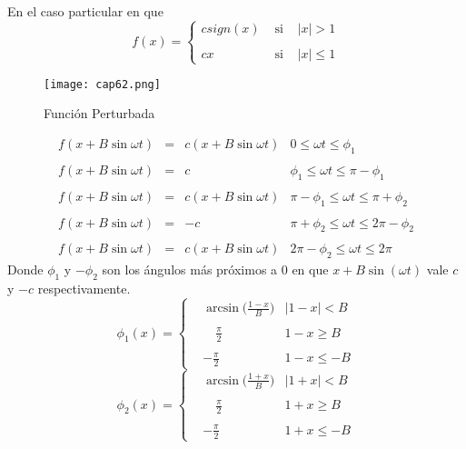 \documentclass[letter]{article}
\begin{document}
\\
En el caso particular en que
\begin{equation}\label{FAP1}
f(x)=\left\{\begin{array}{lcl} c sign(x)&\textrm{ si } & |x|>1\\&&
\\
cx &\textrm{ si }&|x|\leq 1
\end{array}\right.
\end{equation}
\begin{figure}[h]
\centering
\texttt{[image: cap62.png]}
\caption{Funci{\'o}n Perturbada} \label{afig62}
\end{figure}
\begin{equation}\label{eao3}
\begin{array}{lcll}
f(x+B\sin\omega t)&=&c(x+B\sin\omega  t)&0\leq\omega
t\leq\phi_1\\&&&\\ f(x+B\sin\omega t)&=&c&\phi_1\leq\omega  t\leq
\pi-\phi_1\\&&&\\ f(x+B\sin\omega t)&=&c(x+B\sin\omega
t)&\pi-\phi_1\leq\omega  t\leq \pi+\phi_2\\&&&\\ f(x+B\sin\omega
t)&=&-c&\pi+\phi_2\leq\omega  t\leq
2\pi-\phi_2\\&&&\\f(x+B\sin\omega t)&=&c(x+B\sin\omega
t)&2\pi-\phi_2\leq \omega  t\leq 2\pi
\end{array}
\end{equation}
Donde $\phi_1$ y $-\phi_2$ son los {\'a}ngulos m{\'a}s pr{\'o}ximos a 0 en que
$x+B\sin(\omega t)$ vale $c$ y $-c$ respectivamente.
\begin{equation}\label{eao4}
\phi_1(x)=\left\{\begin{array}{cll}
&\arcsin\Big(\displaystyle{\frac{1-x}{B}}\Big)&|1-x|<B\\&&\\&\quad
\displaystyle{\frac{\pi}{2}}&1-x\geq
B\\&&\\&-\displaystyle{\frac{\pi}{2}}&1-x\leq-B
\end{array}\right.
\end{equation}
\begin{equation}\label{eao5}
\phi_2(x)=\left\{\begin{array}{cll} &\arcsin\Big(\displaystyle{
\frac{1+x}{B}}\Big)&|1+x|<B\\&&\\&\quad\displaystyle{\frac{\pi}{2}}&1+x\geq
B\\&&\\&-\displaystyle{\frac{\pi}{2}}&1+x\leq- B
\end{array}\right.
\end{equation}
\end{document}
